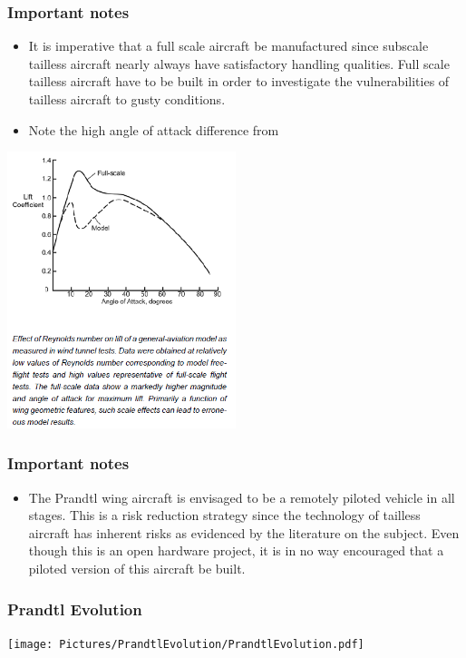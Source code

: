 \documentclass{beamer}
\begin{document}
\begin{frame}
\frametitle{Important notes}

\begin{itemize}
\item It is imperative that a full scale aircraft 
be manufactured since subscale tailless aircraft nearly always have satisfactory handling qualities.  Full scale tailless aircraft 
have to be built in order to investigate the vulnerabilities of tailless aircraft to gusty conditions.
\item Note the high angle of attack difference from \cite{ModelFlightNASA}
\end{itemize}

\includegraphics[width = 0.5\textwidth]{Pictures/ModelAeroVSFullSize.png}

\end{frame}




\begin{frame}
\frametitle{Important notes}

\begin{itemize}
\item The Prandtl wing aircraft is envisaged to be a remotely piloted vehicle in all stages.  This is a risk reduction strategy since the technology of tailless aircraft has inherent risks as evidenced by the literature on the subject.  Even though this is an open hardware project, it is in no way encouraged that a piloted version of this aircraft be built.
\end{itemize}

\end{frame}


\begin{frame}
\frametitle{Prandtl Evolution}

\texttt{[image: Pictures/PrandtlEvolution/PrandtlEvolution.pdf]}

\end{frame}
\end{document}
